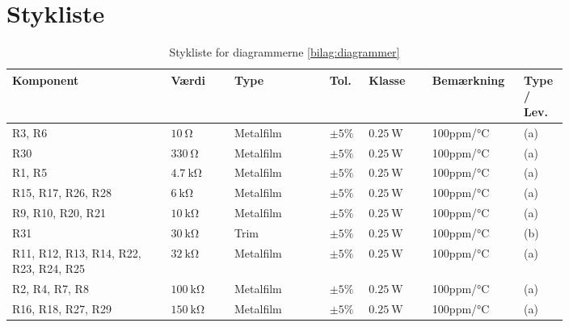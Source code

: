 \chapter{Stykliste} \label{bilag:styklister}
\begin{table}[h!]
\small
\caption{Stykliste for diagrammerne \ref{bilag:diagrammer}}
\label{tab:styklister}
\begin{threeparttable}
\begin{tabular}{p{0.25\linewidth}p{0.1\linewidth}p{0.15\linewidth}p{0.05\linewidth}p{0.1\linewidth}p{0.1\linewidth}p{0.05\linewidth}}
\toprule
\multicolumn{1}{l}{\textbf{Komponent}}       &
\multicolumn{1}{l}{\textbf{Værdi}}       &
\multicolumn{1}{l}{\textbf{Type}}       &
\multicolumn{1}{l}{\textbf{Tol.}} &
\multicolumn{1}{l}{\textbf{Klasse}} &
\multicolumn{1}{l}{\textbf{Bemærkning}} &
\multicolumn{1}{l}{\textbf{Type / Lev.}}  \\ 
\hline
R3, R6 & $\SI{10}{\ohm}$ & Metalfilm & $\pm 5\%$ & $\SI{0.25}{\watt}$ & 100ppm/\si{\celsius} & (a) \\
R30 & $\SI{330}{\ohm}$ & Metalfilm	& $\pm 5\%$ & $\SI{0.25}{\watt}$ & 100ppm/\si{\celsius}  & (a) \\
R1, R5 & $\SI{4.7}{\kilo\ohm}$ & Metalfilm	& $\pm 5\%$ & $\SI{0.25}{\watt}$ & 100ppm/\si{\celsius} & (a) \\
R15, R17, R26, R28 & $\SI{6}{\kilo\ohm}$ & Metalfilm & $\pm 5\%$ & $\SI{0.25}{\watt}$ & 100ppm/\si{\celsius} & (a) \\
R9, R10, R20, R21 & $\SI{10}{\kilo\ohm}$ & Metalfilm & $\pm 5\%$ & $\SI{0.25}{\watt}$ & 100ppm/\si{\celsius} & (a) \\
R31 & $\SI{30}{\kilo\ohm}$ & Trim & $\pm 5\%$ & $\SI{0.25}{\watt}$ & 100ppm/\si{\celsius} & (b) \\
R11, R12, R13, R14, R22, R23, R24, R25 & $\SI{32}{\kilo\ohm}$ & Metalfilm & $\pm 5\%$ & $\SI{0.25}{\watt}$ & 100ppm/\si{\celsius} & (a) \\
R2, R4, R7, R8 & $\SI{100}{\kilo\ohm}$ & Metalfilm & $\pm 5\%$ & $\SI{0.25}{\watt}$ & 100ppm/\si{\celsius} & (a) \\
R16, R18, R27, R29 & $\SI{150}{\kilo\ohm}$ & Metalfilm	& $\pm 5\%$ & $\SI{0.25}{\watt}$ & 100ppm/\si{\celsius} & (a) \\
\midrule

\end{tabular}
\end{threeparttable}
\end{table}
